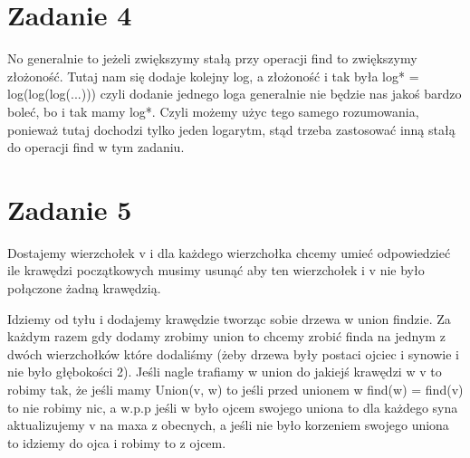 \documentclass[12pt]{article}
\begin{document}
\section{Zadanie 4}
No generalnie to jeżeli zwiększymy stałą przy operacji find to zwiększymy złożoność. Tutaj nam się dodaje kolejny log, a złożoność i tak była log* = log(log(log(...))) czyli dodanie jednego loga generalnie nie będzie nas jakoś bardzo boleć, bo i tak mamy log*. Czyli możemy użyc tego samego rozumowania, ponieważ tutaj dochodzi tylko jeden logarytm, stąd trzeba zastosować inną stałą do operacji find w tym zadaniu.

\section{Zadanie 5}
Dostajemy wierzchołek v i dla każdego wierzchołka chcemy umieć odpowiedzieć ile krawędzi początkowych musimy usunąć aby ten wierzchołek i v nie było połączone żadną krawędzią. 

Idziemy od tyłu i dodajemy krawędzie tworząc sobie drzewa w union findzie. Za każdym razem gdy dodamy zrobimy union to chcemy zrobić finda na jednym z dwóch wierzchołków które dodaliśmy (żeby drzewa były postaci ojciec i synowie i nie było głębokości 2). Jeśli nagle trafiamy w union do jakiejś krawędzi w v to robimy tak, że jeśli mamy Union(v, w) to jeśli przed unionem w find(w) = find(v) to nie robimy nic, a w.p.p jeśli w było ojcem swojego uniona to dla każdego syna aktualizujemy v na maxa z obecnych, a jeśli nie było korzeniem swojego uniona to idziemy do ojca i robimy to z ojcem.

\egroup
\end{document}
